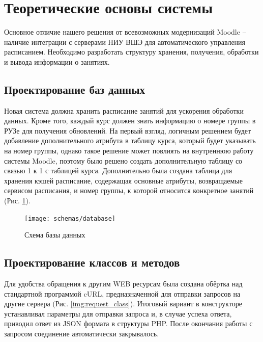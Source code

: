 \documentclass[a4paper,14pt]{article}
\begin{document}

\section{Теоретические основы системы} 

Основное отличие нашего решения от всевозможных модернизаций Moodle -- наличие интеграции с серверами НИУ ВШЭ для автоматического управления расписанием.
Необходимо разработать структуру хранения, получения, обработки и вывода информации о занятиях.

\subsection{Проектирование баз данных}

Новая система должна хранить расписание занятий для ускорения обработки данных.
Кроме того, каждый курс должен знать информацию о номере группы в РУЗе для получения обновлений.
На первый взгляд, логичным решением будет добавление дополнительного атрибута в таблицу курса, который будет указывать на номер группы, однако такое решение может повлиять на внутреннюю работу системы Moodle, поэтому было решено создать дополнительную таблицу со связью 1 к 1 с таблицей курса.
Дополнительно была создана таблица для хранения кэшей расписание, содержащая основные атрибуты, возвращаемые сервисом расписания, и номер группы, к которой относится конкретное занятий (Рис. \ref{img:db_struct}).

\begin{figure}[H]
	\centering		
	\texttt{[image: schemas/database]}
	\caption{Схема базы данных}\label{img:db_struct}
\end{figure}

\subsection{Проектирование классов и методов}

Для удобства обращения к другим WEB ресурсам была создана обёртка над стандартной программой cURL, предназначенной для отправки запросов на другие сервера (Рис. \ref{img:request_class}).
Итоговый вариант в конструкторе устанавливал параметры для отправки запроса и, в случае успеха ответа, приводил ответ из JSON формата в структуры PHP.
После окончания работы с запросом соединение автоматически закрывалось.
\end{document}
